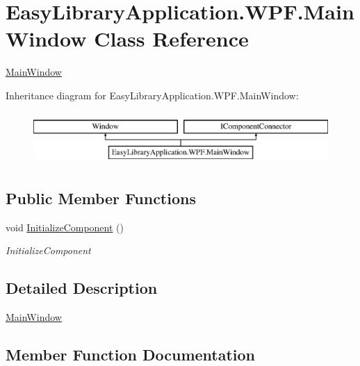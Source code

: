 \hypertarget{class_easy_library_application_1_1_w_p_f_1_1_main_window}{}\section{Easy\+Library\+Application.\+W\+P\+F.\+Main\+Window Class Reference}
\label{class_easy_library_application_1_1_w_p_f_1_1_main_window}


\mbox{\hyperlink{class_easy_library_application_1_1_w_p_f_1_1_main_window}{Main\+Window}}  


Inheritance diagram for Easy\+Library\+Application.\+W\+P\+F.\+Main\+Window\+:\begin{figure}[H]
\begin{center}
\leavevmode
\includegraphics[height=2.000000cm]{class_easy_library_application_1_1_w_p_f_1_1_main_window}
\end{center}
\end{figure}
\subsection*{Public Member Functions}
\begin{DoxyCompactItemize}
\item 
void \mbox{\hyperlink{class_easy_library_application_1_1_w_p_f_1_1_main_window_a949041a48553398d626cbb1633ccaf15}{Initialize\+Component}} ()
\begin{DoxyCompactList}\small\item\em Initialize\+Component \end{DoxyCompactList}\end{DoxyCompactItemize}


\subsection{Detailed Description}
\mbox{\hyperlink{class_easy_library_application_1_1_w_p_f_1_1_main_window}{Main\+Window}} 



\subsection{Member Function Documentation}
\mbox{\label{class_easy_library_application_1_1_w_p_f_1_1_main_window_a949041a48553398d626cbb1633ccaf15}} 
